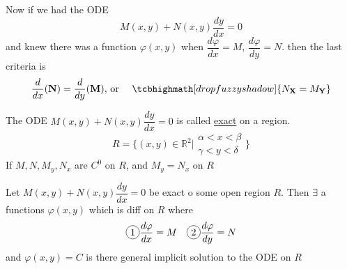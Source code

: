 Now if we had the ODE
\begin{equation*}
	M(x,y) + N(x,y)\dfrac{dy}{dx} = 0
\end{equation*}
and knew there was a function $\varphi (x,y)$ when $\dfrac{d \varphi}{dx} = M$, $\dfrac{d \varphi}{dy} = N$. then the last criteria is
\begin{equation*}
	\dfrac{d}{dx}(\textbf{N}) = \dfrac{d}{dy}(\textbf{M}) \text{, or } \quad \tcbhighmath[drop fuzzy shadow]{N_{\textbf{X}} = M_{\textbf{Y}}}
\end{equation*}
\begin{definition-N}
	The ODE $M(x,y) + N(x,y)\dfrac{dy}{dx} = 0$ is called \underline{exact} on a region.
	\begin{equation*}
		R = \bigg\{ {(x,y) \in \mathbb{R}^2 \bigg| \begin{split}
			\alpha < x < \beta\\
			\gamma < y < \delta
		\end{split}} \bigg\} 
	\end{equation*}
	If  $M, N, M_y, N_x$ are $C^0$ on $R$, and  $M_y = N_x$ on $R$
\end{definition-N}
\begin{theorem-N}
	Let $M(x,y) + N(x,y)\dfrac{dy}{dx} = 0$ be exact o some open region $R$. Then $\exists$ a functions $\varphi(x,y)$ which is diff on $R$ where
	\begin{equation*}
		\circled{1} \dfrac{d \varphi}{dx} = M \quad \circled{2} \dfrac{d \varphi}{dy} = N
	\end{equation*} and $\varphi (x,y) = C$ is there general implicit solution to the ODE on $R$
\end{theorem-N}
